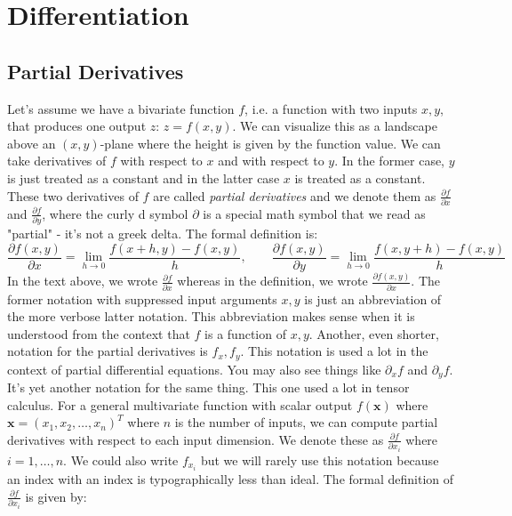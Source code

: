 \section{Differentiation}

\subsection{Partial Derivatives}
Let's assume we have a bivariate function $f$, i.e. a function with two inputs $x,y$, that produces one output $z$: $z = f(x,y)$. We can visualize this as a landscape above an $(x,y)$-plane where the height is given by the function value. We can take derivatives of $f$ with respect to $x$ and with respect to $y$. In the former case, $y$ is just treated as a constant and in the latter case $x$ is treated as a constant. These two derivatives of $f$ are called \emph{partial derivatives} and we denote them as $\frac{\partial f}{\partial x}$ and $\frac{\partial f}{\partial y}$, where the curly d symbol $\partial$ is a special math symbol that we read as "partial" - it's not a greek delta. The formal definition is:
\begin{equation}
 \frac{\partial f(x,y)}{\partial x} = \lim_{h \rightarrow 0} \frac{f(x+h,y) - f(x,y)}{h}, \qquad
 \frac{\partial f(x,y)}{\partial y} = \lim_{h \rightarrow 0} \frac{f(x,y+h) - f(x,y)}{h}
\end{equation}
In the text above, we wrote $\frac{\partial f}{\partial x}$ whereas in the definition, we wrote  $\frac{\partial f(x,y)}{\partial x}$. The former notation with suppressed input arguments $x,y$ is just an abbreviation of the more verbose latter notation. This abbreviation makes sense when it is understood from the context that $f$ is a function of $x,y$. Another, even shorter, notation for the partial derivatives is $f_x, f_y$. This notation is used a lot in the context of partial differential equations. You may also see things like $\partial_x f$ and $\partial_y f$. It's yet another notation for the same thing. This one used a lot in tensor calculus. For a general multivariate function with scalar output $f(\mathbf{x})$ where $\mathbf{x} = (x_1,x_2,\ldots,x_n)^T$ where $n$ is the number of inputs, we can compute partial derivatives with respect to each input dimension. We denote these as $\frac{\partial f}{\partial x_i}$ where $i = 1,\ldots,n$. We could also write $f_{x_i}$ but we will rarely use this notation because an index with an index is typographically less than ideal. The formal definition of $\frac{\partial f}{\partial x_i}$ is given by:
